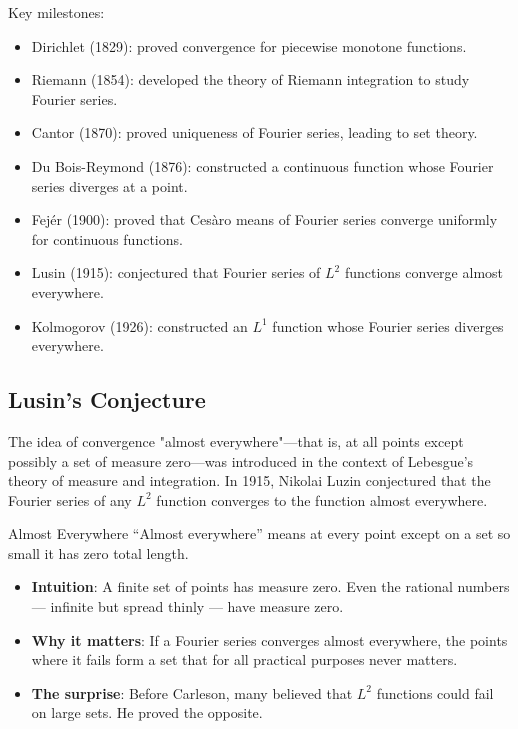 Key milestones:
\begin{itemize}
\item Dirichlet (1829): proved convergence for piecewise monotone functions.
\item Riemann (1854): developed the theory of Riemann integration to study Fourier series.
\item Cantor (1870): proved uniqueness of Fourier series, leading to set theory.
\item Du Bois-Reymond (1876): constructed a continuous function whose Fourier series diverges at a point.
\item Fej\'er (1900): proved that Ces\`aro means of Fourier series converge uniformly for continuous functions.
\item Lusin (1915): conjectured that Fourier series of $L^2$ functions converge almost everywhere.
\item Kolmogorov (1926): constructed an $L^1$ function whose Fourier series diverges everywhere.
\end{itemize}

\subsection{Lusin's Conjecture}

The idea of convergence "almost everywhere"---that is, at all points except possibly a set of measure zero---was introduced in the context of Lebesgue's theory of measure and integration. In 1915, Nikolai Luzin conjectured that the Fourier series of any $L^2$ function converges to the function almost everywhere.

\begin{knowledgebridge}{Almost Everywhere}
``Almost everywhere'' means at every point except on a set so small it has zero total length.
\begin{itemize}
    \item \textbf{Intuition}: A finite set of points has measure zero. Even the rational numbers --- infinite but spread thinly --- have measure zero.
    \item \textbf{Why it matters}: If a Fourier series converges almost everywhere, the points where it fails form a set that for all practical purposes never matters.
    \item \textbf{The surprise}: Before Carleson, many believed that $L^2$ functions could fail on large sets. He proved the opposite.
\end{itemize}
\end{knowledgebridge}

